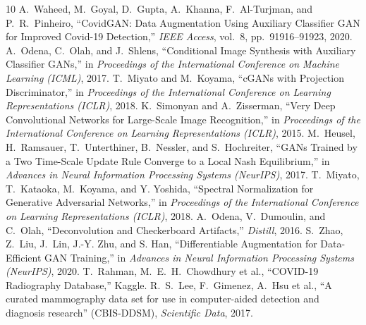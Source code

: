 \documentclass[11pt]{article}
\begin{document}
\begin{thebibliography}{10}
 A.~Waheed, M.~Goyal, D.~Gupta, A.~Khanna, F.~Al-Turjman, and P.~R.~Pinheiro, ``CovidGAN: Data Augmentation Using Auxiliary Classifier GAN for Improved Covid-19 Detection,'' \emph{IEEE Access}, vol.~8, pp.~91916--91923, 2020.
 A.~Odena, C.~Olah, and J.~Shlens, ``Conditional Image Synthesis with Auxiliary Classifier GANs,'' in \emph{Proceedings of the International Conference on Machine Learning (ICML)}, 2017.
 T.~Miyato and M.~Koyama, ``cGANs with Projection Discriminator,'' in \emph{Proceedings of the International Conference on Learning Representations (ICLR)}, 2018.
 K.~Simonyan and A.~Zisserman, ``Very Deep Convolutional Networks for Large-Scale Image Recognition,'' in \emph{Proceedings of the International Conference on Learning Representations (ICLR)}, 2015.
 M.~Heusel, H.~Ramsauer, T.~Unterthiner, B.~Nessler, and S.~Hochreiter, ``GANs Trained by a Two Time-Scale Update Rule Converge to a Local Nash Equilibrium,'' in \emph{Advances in Neural Information Processing Systems (NeurIPS)}, 2017.
 T.~Miyato, T.~Kataoka, M.~Koyama, and Y. Yoshida, ``Spectral Normalization for Generative Adversarial Networks,'' in \emph{Proceedings of the International Conference on Learning Representations (ICLR)}, 2018.
 A.~Odena, V.~Dumoulin, and C.~Olah, ``Deconvolution and Checkerboard Artifacts,'' \emph{Distill}, 2016.
 S.~Zhao, Z.~Liu, J.~Lin, J.-Y. Zhu, and S. Han, ``Differentiable Augmentation for Data-Efficient GAN Training,'' in \emph{Advances in Neural Information Processing Systems (NeurIPS)}, 2020.
 T.~Rahman, M.~E.~H.~Chowdhury et al., ``COVID-19 Radiography Database,'' Kaggle.
 R.~S.~Lee, F.~Gimenez, A.~Hsu et al., ``A curated mammography data set for use in computer-aided detection and diagnosis research'' (CBIS-DDSM), \emph{Scientific Data}, 2017.
\end{thebibliography}
\end{document}
